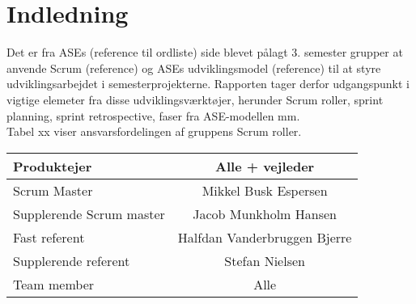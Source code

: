 \chapter{Indledning}
Det er fra ASEs (reference til ordliste) side blevet pålagt 3. semester grupper at anvende Scrum (reference) og ASEs udviklingsmodel (reference) til at styre udviklingsarbejdet i semesterprojekterne. Rapporten tager derfor udgangspunkt i vigtige elemeter fra disse udviklingsværktøjer, herunder Scrum roller, sprint planning, sprint retrospective, faser fra ASE-modellen mm.\\

Tabel xx viser ansvarsfordelingen af gruppens Scrum roller. \\

\begin{tabular}{| l | c |}
\hline
Produktejer & Alle + vejleder\\\hline
Scrum Master & Mikkel Busk Espersen\\\hline
Supplerende Scrum master & Jacob Munkholm Hansen\\\hline
Fast referent & Halfdan Vanderbruggen Bjerre\\\hline
Supplerende referent & Stefan Nielsen\\\hline
Team member & Alle\\\hline
\end{tabular}